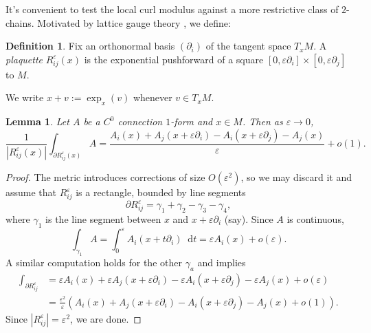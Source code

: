 \documentclass[reqno,11pt]{amsart}
\newcommand*\dif{\mathop{}\!\mathrm{d}}
\newcommand{\dfn}[1]{\emph{#1}\index{#1}}
\newtheorem{lemma}[theorem]{Lemma}
\theoremstyle{definition}
\newtheorem{definition}[theorem]{Definition}
\numberwithin{equation}{section}
\begin{document}
It's convenient to test the local curl modulus against a more restrictive class of $2$-chains.
Motivated by lattice gauge theory \cite{Gupta98}, we define:

\begin{definition}
Fix an orthonormal basis $(\partial_i)$ of the tangent space $T_x M$.
A \dfn{plaquette} $R_{ij}^\varepsilon(x)$ is the exponential pushforward of a square $[0, \varepsilon \partial_i] \times [0, \varepsilon \partial_j]$ to $M$.
\end{definition}

We write $x + v := \exp_x(v)$ whenever $v \in T_x M$.

\begin{lemma}
Let $A$ be a $C^0$ connection $1$-form and $x \in M$. Then as $\varepsilon \to 0$,
\begin{equation} \label{riemann plaquette}
	\frac{1}{|R_{ij}^\varepsilon(x)|} \int_{\partial R_{ij}^\varepsilon(x)} A = \frac{A_i(x) + A_j(x + \varepsilon \partial_i) - A_i(x + \varepsilon \partial_j) - A_j(x)}{\varepsilon} + o(1).
\end{equation}
\end{lemma}
\begin{proof}
The metric introduces corrections of size $O(\varepsilon^2)$, so we may discard it and assume that $R_{ij}^\varepsilon$ is a rectangle, bounded by line segments 
$$\partial R_{ij}^\varepsilon = \gamma_1 + \gamma_2 - \gamma_3 - \gamma_4,$$
where $\gamma_1$ is the line segment between $x$ and $x + \varepsilon \partial_i$ (say).
Since $A$ is continuous, 
$$\int_{\gamma_1} A = \int_0^\varepsilon A_i(x + t\partial_i) \dif t = \varepsilon A_i(x) + o(\varepsilon).$$
A similar computation holds for the other $\gamma_a$ and implies 
\begin{align*}
\int_{\partial R_{ij}^\varepsilon}
&= \varepsilon A_i(x) + \varepsilon A_j(x + \varepsilon \partial_i) - \varepsilon A_i(x + \varepsilon \partial_j) - \varepsilon A_j(x) + o(\varepsilon) \\
&= \frac{\varepsilon^2}{\varepsilon}(A_i(x) + A_j(x + \varepsilon \partial_i) - A_i(x + \varepsilon \partial_j) - A_j(x) + o(1)).
\end{align*}
Since $|R_{ij}^\varepsilon| = \varepsilon^2$, we are done.
\end{proof}
\end{document}
